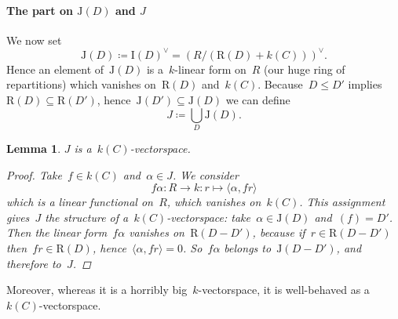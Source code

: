 \documentclass[10pt,a4paper]{article}
\theoremstyle{lecture}
\newtheorem{lemma}[theorem]{Lemma}
\newcommand\dash{\nobreakdash-\hspace{0pt}}
\begin{document}
\paragraph{The part on $\mathrm{J}(D)$ and $J$}
We now set
\begin{equation}
  \mathrm{J}(D)\coloneqq\mathrm{I}(D)^\vee=(R/(\mathrm{R}(D)+k(C)))^\vee.
\end{equation}
Hence an element of~$\mathrm{J}(D)$ is a~$k$\dash linear form on~$R$ (our huge ring of repartitions) which vanishes on~$\mathrm{R}(D)$ and~$k(C)$. Because~$D\leq D'$ implies~$\mathrm{R}(D)\subseteq\mathrm{R}(D')$, hence~$\mathrm{J}(D')\subseteq\mathrm{J}(D)$ we can define
\begin{equation}
  J\coloneqq\bigcup_{D}\mathrm{J}(D).
\end{equation}
\begin{lemma}
  \label{lemma:J-k(C)-vectorspace}
  $J$ is a~$k(C)$\dash vectorspace.
  \begin{proof}
    Take~$f\in k(C)$ and~$\alpha\in J$. We consider
    \begin{equation}
      f\alpha\colon R\to k:r\mapsto\langle\alpha,fr\rangle
    \end{equation}
    which is a linear functional on~$R$, which vanishes on~$k(C)$. This assignment gives~$J$ the structure of a~$k(C)$\dash vectorspace: take~$\alpha\in\mathrm{J}(D)$ and~$(f)=D'$. Then the linear form~$f\alpha$ vanishes on~$\mathrm{R}(D-D')$, because if~$r\in\mathrm{R}(D-D')$ then~$fr\in\mathrm{R}(D)$, hence~$\langle\alpha,fr\rangle=0$. So~$f\alpha$ belongs to~$\mathrm{J}(D-D')$, and therefore to~$J$.
  \end{proof}
\end{lemma}
Moreover, whereas it is a horribly big~$k$\dash vectorspace, it is well-behaved as a~$k(C)$\dash vectorspace.
\end{document}

